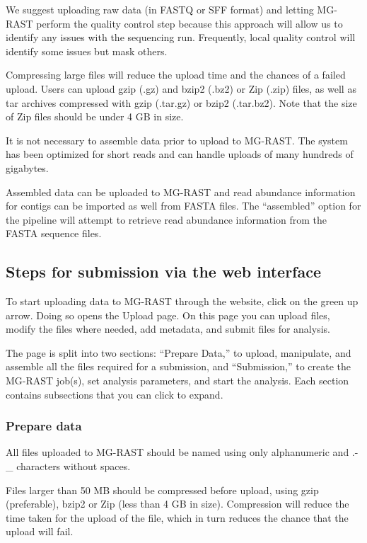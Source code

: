 \documentclass[12pt,fullpage]{report}
\begin{document}
We suggest uploading raw data (in FASTQ or SFF format) and letting MG-RAST perform the quality control step because
this approach will allow us to identify any issues with the sequencing run. Frequently, local quality control will identify some
issues but mask others.

Compressing large files will reduce the upload time and the chances of a failed upload. Users can upload gzip (.gz) and bzip2 (.bz2) or Zip (.zip) files, as well as tar archives compressed with gzip (.tar.gz) or bzip2 (.tar.bz2). Note that the size of Zip files should be under 4 GB in size.

It is not necessary to assemble data prior to upload to MG-RAST. The system has been optimized for short reads and can handle uploads of many hundreds of gigabytes.

Assembled data can be uploaded to MG-RAST and read abundance information for contigs can be imported as well from FASTA files.
The ``assembled'' option for the pipeline will attempt to retrieve read abundance information from the FASTA sequence files.
\subsection{Steps for submission via the web interface}

To start uploading data to MG-RAST through the website, click on the green up arrow. Doing so opens the Upload page.
On this page you can upload files, modify the files where needed, add metadata, and submit files for analysis.

The page is split into two sections: ``Prepare Data,'' to upload, manipulate, and assemble all the files required for a submission, and ``Submission,'' to create the MG-RAST job(s), set analysis parameters, and start the analysis. Each section contains subsections that you can click to expand.
\subsubsection{Prepare data}

All files uploaded to MG-RAST should be named using only alphanumeric and .-\_ characters without spaces. 

Files larger than 50 MB should be compressed before upload, using gzip (preferable), bzip2 or Zip (less than 4 GB in size). Compression will reduce the time taken for the upload of the file, which in turn reduces the chance that the upload will fail.
\end{document}
